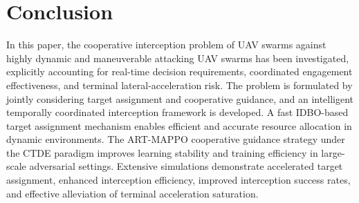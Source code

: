 \documentclass[lettersize,journal]{IEEEtran}
\begin{document}

\section{Conclusion}
\label{sec:conclusion}

In this paper, the cooperative interception problem of UAV swarms against highly dynamic and
maneuverable attacking UAV swarms has been investigated, explicitly accounting for real-time
decision requirements, coordinated engagement effectiveness, and terminal lateral-acceleration risk.
The problem is formulated by jointly considering target assignment and cooperative guidance,
and an intelligent temporally coordinated interception framework is developed.
A fast IDBO-based target assignment mechanism enables efficient and accurate resource
allocation in dynamic environments.
The ART-MAPPO cooperative guidance strategy under the CTDE paradigm improves learning
stability and training efficiency in large-scale adversarial settings.
Extensive simulations demonstrate accelerated target assignment, enhanced interception efficiency, improved
interception success rates, and effective alleviation of terminal acceleration saturation.
\end{document}
